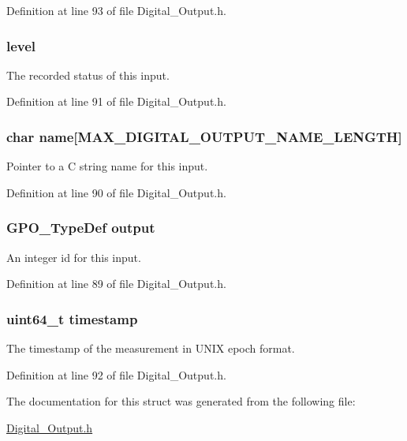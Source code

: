 Definition at line 93 of file Digital\-\_\-\-Output.\-h.

\hypertarget{struct_digital___output__t_a077d2fbd9f466d58856071f5314b9c09}{
\subsubsection[{level}]{ level}}\label{struct_digital___output__t_a077d2fbd9f466d58856071f5314b9c09}
The recorded status of this input. 

Definition at line 91 of file Digital\-\_\-\-Output.\-h.

\hypertarget{struct_digital___output__t_af161017167d4afb064b9c104877041e9}{
\subsubsection[{name}]{\setlength{\rightskip}{0pt plus 5cm}char name\mbox{[}{\bf M\-A\-X\-\_\-\-D\-I\-G\-I\-T\-A\-L\-\_\-\-O\-U\-T\-P\-U\-T\-\_\-\-N\-A\-M\-E\-\_\-\-L\-E\-N\-G\-T\-H}\mbox{]}}}\label{struct_digital___output__t_af161017167d4afb064b9c104877041e9}
Pointer to a C string name for this input. 

Definition at line 90 of file Digital\-\_\-\-Output.\-h.

\hypertarget{struct_digital___output__t_ac7a7d7f3d154ec3152de97d06a7870f1}{
\subsubsection[{output}]{\setlength{\rightskip}{0pt plus 5cm}G\-P\-O\-\_\-\-Type\-Def output}}\label{struct_digital___output__t_ac7a7d7f3d154ec3152de97d06a7870f1}
An integer id for this input. 

Definition at line 89 of file Digital\-\_\-\-Output.\-h.

\hypertarget{struct_digital___output__t_a465bef81f6478756e5443025b1f2ddfa}{
\subsubsection[{timestamp}]{\setlength{\rightskip}{0pt plus 5cm}uint64\-\_\-t timestamp}}\label{struct_digital___output__t_a465bef81f6478756e5443025b1f2ddfa}
The timestamp of the measurement in U\-N\-I\-X epoch format. 

Definition at line 92 of file Digital\-\_\-\-Output.\-h.



The documentation for this struct was generated from the following file\-:\begin{DoxyCompactItemize}
\item 
\hyperlink{_digital___output_8h}{Digital\-\_\-\-Output.\-h}\end{DoxyCompactItemize}
